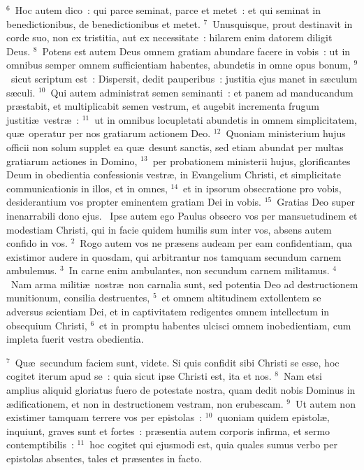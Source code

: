 ${}^{6}$~Hoc autem dico~: qui parce seminat, parce et metet~: et qui seminat in benedictionibus, de benedictionibus et metet.
${}^{7}$~Unusquisque, prout destinavit in corde suo, non ex tristitia, aut ex necessitate~: hilarem enim datorem diligit Deus.
${}^{8}$~Potens est autem Deus omnem gratiam abundare facere in vobis~: ut in omnibus semper omnem sufficientiam habentes, abundetis in omne opus bonum,
${}^{9}$~sicut scriptum est~: Dispersit, dedit pauperibus~: justitia ejus manet in s\ae culum s\ae culi.
${}^{10}$~Qui autem administrat semen seminanti~: et panem ad manducandum pr\ae stabit, et multiplicabit semen vestrum, et augebit incrementa frugum justiti\ae\ vestr\ae~:
${}^{11}$~ut in omnibus locupletati abundetis in omnem simplicitatem, qu\ae\ operatur per nos gratiarum actionem Deo.
${}^{12}$~Quoniam ministerium hujus officii non solum supplet ea qu\ae\ desunt sanctis, sed etiam abundat per multas gratiarum actiones in Domino,
${}^{13}$~per probationem ministerii hujus, glorificantes Deum in obedientia confessionis vestr\ae , in Evangelium Christi, et simplicitate communicationis in illos, et in omnes,
${}^{14}$~et in ipsorum obsecratione pro vobis, desiderantium vos propter eminentem gratiam Dei in vobis.
${}^{15}$~Gratias Deo super inenarrabili dono ejus.
~Ipse autem ego Paulus obsecro vos per mansuetudinem et modestiam Christi, qui in facie quidem humilis sum inter vos, absens autem confido in vos.
${}^{2}$~Rogo autem vos ne pr\ae sens audeam per eam confidentiam, qua existimor audere in quosdam, qui arbitrantur nos tamquam secundum carnem ambulemus.
${}^{3}$~In carne enim ambulantes, non secundum carnem militamus.
${}^{4}$~Nam arma militi\ae\ nostr\ae\ non carnalia sunt, sed potentia Deo ad destructionem munitionum, consilia destruentes,
${}^{5}$~et omnem altitudinem extollentem se adversus scientiam Dei, et in captivitatem redigentes omnem intellectum in obsequium Christi,
${}^{6}$~et in promptu habentes ulcisci omnem inobedientiam, cum impleta fuerit vestra obedientia.


${}^{7}$~Qu\ae\ secundum faciem sunt, videte. Si quis confidit sibi Christi se esse, hoc cogitet iterum apud se~: quia sicut ipse Christi est, ita et nos.
${}^{8}$~Nam etsi amplius aliquid gloriatus fuero de potestate nostra, quam dedit nobis Dominus in \ae dificationem, et non in destructionem vestram, non erubescam.
${}^{9}$~Ut autem non existimer tamquam terrere vos per epistolas~:
${}^{10}$~quoniam quidem epistol\ae , inquiunt, graves sunt et fortes~: pr\ae sentia autem corporis infirma, et sermo contemptibilis~:
${}^{11}$~hoc cogitet qui ejusmodi est, quia quales sumus verbo per epistolas absentes, tales et pr\ae sentes in facto.


